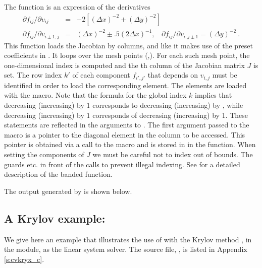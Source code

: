 The  function is an expression of the derivatives
\vspace*{-.08in}
\begin{eqnarray*}
\partial f_{ij} / \partial v_{ij} &=&
         -2 [(\Delta x)^{-2} + (\Delta y)^{-2}] \\
\partial f_{ij} / \partial v_{i \pm 1,j} &=& (\Delta x)^{-2} 
                  \pm .5 (2 \Delta x)^{-1}, ~~~~
\partial f_{ij} / \partial v_{i,j \pm 1}  =  (\Delta y)^{-2} ~. 
\end{eqnarray*}
This function loads the Jacobian by columns, and like  it
makes use of the preset coefficients in .
It loops over the mesh points (,). For each such mesh
point, the one-dimensional index  is computed
and the th column of the Jacobian matrix $J$ is set. 
The row index $k'$ of each component $f_{i',j'}$ that depends on
$v_{i,j}$ must be identified in order to load the corresponding element.
The elements are loaded with the  macro.
Note that the formula for the global index $k$ implies that decreasing 
(increasing)  by $1$ corresponds to decreasing (increasing) 
 by , while decreasing (increasing)  by $1$ 
corresponds of decreasing (increasing)  by $1$. 
These statements are reflected in the arguments to . 
The first argument passed to the  macro is a pointer to
the diagonal element in the column to be accessed. This pointer is obtained
via a call to the  macro and is stored in  in
the  function. When setting the components of $J$ we must be
careful not to index out of bounds. The guards  etc.
in front of the calls to  prevent illegal indexing.
See  for a detailed description of the banded 
function.

The output generated by  is shown below.



\subsection{A Krylov example: }\label{ss:cvkryx}

We give here an example that illustrates the use of {\cvode} with the Krylov
method {\spgmr}, in the {\cvspgmr} module, as the linear system solver.  
The source file, , is listed in Appendix \ref{s:cvkryx_c}.

